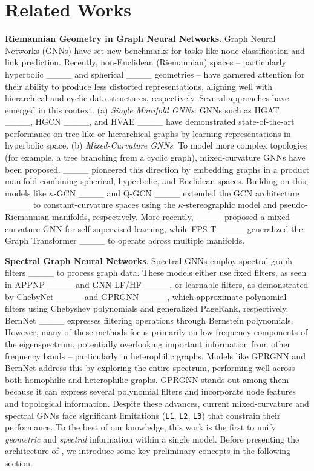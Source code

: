 \section{Related Works}
\vspace{-2mm}
\textbf{Riemannian Geometry in Graph Neural Networks}. Graph Neural Networks (GNNs) have set new benchmarks for tasks like node classification and link prediction. Recently, non-Euclidean (Riemannian) spaces -- particularly hyperbolic ____ and spherical ____ geometries -- have garnered attention for their ability to produce less distorted representations, aligning well with hierarchical and cyclic data structures, respectively. Several approaches have emerged in this context. (a) \textit{Single Manifold GNNs}: GNNs such as HGAT ____, HGCN ____, and HVAE ____ have demonstrated state-of-the-art performance on tree-like or hierarchical graphs by learning representations in hyperbolic space. (b) \textit{Mixed-Curvature GNNs}: To model more complex topologies (for example, a tree branching from a cyclic graph), mixed-curvature GNNs have been proposed. ____ pioneered this direction by embedding graphs in a product manifold combining spherical, hyperbolic, and Euclidean spaces. Building on this, models like $\kappa$-GCN ____ and Q-GCN ____ extended the GCN architecture ____ to constant-curvature spaces using the $\kappa$-stereographic model and pseudo-Riemannian manifolds, respectively. More recently, ____ proposed a mixed-curvature GNN for self-supervised learning, while FPS-T ____ generalized the Graph Transformer ____ to operate across multiple manifolds.

\textbf{Spectral Graph Neural Networks}. Spectral GNNs employ spectral graph filters ____ to process graph data. These models either use fixed filters, as seen in APPNP ____ and GNN-LF/HF ____, or learnable filters, as demonstrated by ChebyNet ____ and GPRGNN ____, which approximate polynomial filters using Chebyshev polynomials and generalized PageRank, respectively. BernNet ____ expresses filtering operations through Bernstein polynomials. However, many of these methods focus primarily on low-frequency components of the eigenspectrum, potentially overlooking important information from other frequency bands -- particularly in heterophilic graphs. Models like GPRGNN and BernNet address this by exploring the entire spectrum, performing well across both homophilic and heterophilic graphs. GPRGNN stands out among them because it can express several polynomial filters and incorporate node features and topological information. Despite these advances, current mixed-curvature and spectral GNNs face significant limitations (\texttt{L1}, \texttt{L2}, \texttt{L3}) that constrain their performance. To the best of our knowledge, this work is the first to unify \textit{geometric} and \textit{spectral} information within a single model. Before presenting the architecture of \modelname, we introduce some key preliminary concepts in the following section.